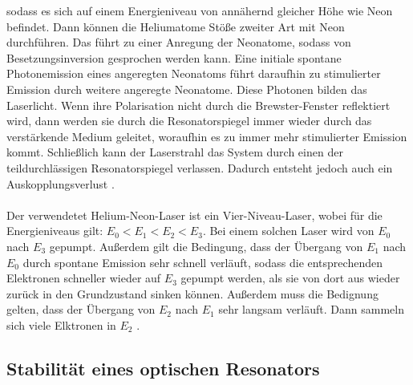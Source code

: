 sodass es sich auf einem Energieniveau von annähernd gleicher Höhe wie Neon befindet.
Dann können die Heliumatome Stöße zweiter Art mit Neon durchführen.
Das führt zu einer Anregung der Neonatome, sodass von Besetzungsinversion 
gesprochen werden kann. Eine initiale spontane Photonemission eines angeregten 
Neonatoms führt daraufhin zu stimulierter Emission durch weitere angeregte Neonatome. 
Diese Photonen bilden das Laserlicht. Wenn ihre Polarisation nicht durch die 
Brewster-Fenster reflektiert wird, dann werden sie durch die Resonatorspiegel 
immer wieder durch das verstärkende Medium geleitet, woraufhin es zu immer mehr
stimulierter Emission kommt. Schließlich kann der Laserstrahl das System durch einen 
der teildurchlässigen Resonatorspiegel verlassen. Dadurch entsteht jedoch auch ein 
Auskopplungsverlust \cite{2}.\\\\
Der verwendetet Helium-Neon-Laser ist ein Vier-Niveau-Laser, wobei für die 
Energieniveaus gilt: $E_{\text{0}} <E_{\text{1}} < E_{\text{2}} < E_{\text{3}}$.
Bei einem solchen Laser wird von $E_{\text{0}}$ nach $E_{\text{3}}$ gepumpt. 
Außerdem gilt die Bedingung, dass der Übergang von $E_{\text{1}}$ nach $E_{\text{0}}$
durch spontane Emission sehr schnell verläuft, sodass die entsprechenden 
Elektronen schneller wieder auf $E_{\text{3}}$ gepumpt werden, als sie von dort 
aus wieder zurück in den Grundzustand sinken können. Außerdem muss die 
Bedignung gelten, dass der Übergang von $E_{\text{2}}$ nach $E_{\text{1}}$
sehr langsam verläuft. Dann sammeln sich viele Elktronen in $E_{\text{2}}$ \cite{3}.

\subsection{Stabilität eines optischen Resonators}

